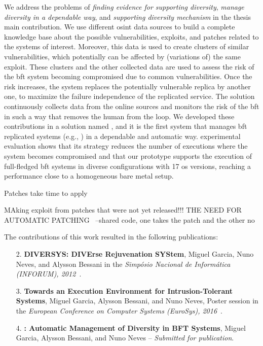 We address the problems of \emph{finding evidence for supporting diversity}, \emph{manage diversity in a dependable way}, and \emph{supporting diversity mechanism} in the thesis main contribution.
We use different \gls{osint} data sources to build a complete knowledge base about the possible vulnerabilities, exploits, and patches related to the systems of interest. 
Moreover, this data is used to create clusters of similar vulnerabilities, which potentially can be affected by (variations of) the same exploit. 
These clusters and the other collected data are used to assess the risk of the \gls{bft} system becoming compromised due to common vulnerabilities.
Once the risk increases, the system replaces the potentially vulnerable replica by another one, to maximize the failure independence of the replicated service.
The solution continuously collects data from the online sources and monitors the risk of the \gls{bft} in such a way that removes the human from the loop.
We developed these contributions in a solution named \system, and it is the first system that manages \gls{bft} replicated systems (e.g., \sieveq) in a dependable and automatic way.
\system experimental evaluation shows that its strategy reduces the number of executions where the system becomes compromised and that our prototype supports the execution of full-fledged \gls{bft} systems in diverse configurations with 17 \gls{os} versions, reaching a performance close to a homogeneous bare metal setup. 


Patches take time to apply~\cite{Frei:2010}

MAking exploit from patches that were not yet released!!!\cite{Brumley:2008}
THE NEED FOR AUTOMATIC PATCHING~\cite{Nappa:2015} --shared code, one takes the patch and the other no


The contributions of this work resulted in the following publications:

\begin{enumerate}

\item[2.] \textbf{DIVERSYS: DIVErse Rejuvenation SYStem}, Miguel Garcia, Nuno Neves, and  Alysson Bessani in the \emph{Simp\'{o}sio Nacional de Inform\'{a}tica (INFORUM), 2012~\cite{Garcia:2012b}}.


\item[3.] \textbf{Towards an Execution Environment for Intrusion-Tolerant Systems}, Miguel Garcia, Alysson Bessani, and Nuno Neves, Poster session in the \emph{European Conference on Computer Systems (EuroSys), 2016}~\cite{Garcia:2016b}.


\item[4.] \textbf{\system: Automatic Management of Diversity in BFT Systems}, Miguel Garcia, Alysson Bessani, and Nuno Neves -- \emph{Submitted for publication}.

\end{enumerate}


